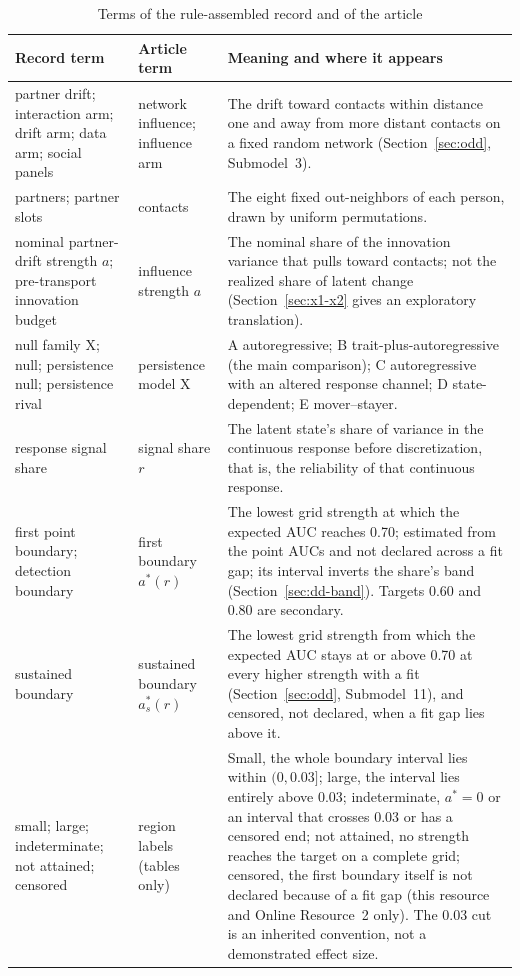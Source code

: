 \begin{table}[htbp]
\caption{Terms of the rule-assembled record and of the article}\label{tab:glossary-terms}
\centering\footnotesize
\begin{tabular}{@{}>{\raggedright\arraybackslash}p{}>{\raggedright\arraybackslash}p{}>{\raggedright\arraybackslash}p{}@{}}
\toprule
Record term & Article term & Meaning and where it appears \\
\midrule
partner drift; interaction arm; drift arm; data arm; social panels & network influence; influence arm & The drift toward contacts within distance one and away from more distant contacts on a fixed random network (Section~\ref{sec:odd}, Submodel~3). \\
partners; partner slots & contacts & The eight fixed out-neighbors of each person, drawn by uniform permutations. \\
nominal partner-drift strength $a$; pre-transport innovation budget & influence strength $a$ & The nominal share of the innovation variance that pulls toward contacts; not the realized share of latent change (Section~\ref{sec:x1-x2} gives an exploratory translation). \\
null family X; null; persistence null; persistence rival & persistence model X & A autoregressive; B trait-plus-autoregressive (the main comparison); C autoregressive with an altered response channel; D state-dependent; E mover--stayer. \\
response signal share & signal share $r$ & The latent state's share of variance in the continuous response before discretization, that is, the reliability of that continuous response. \\
first point boundary; detection boundary & first boundary $a^*(r)$ & The lowest grid strength at which the expected AUC reaches 0.70; estimated from the point AUCs and not declared across a fit gap; its interval inverts the share's band (Section~\ref{sec:dd-band}). Targets 0.60 and 0.80 are secondary. \\
sustained boundary & sustained boundary $a_s^*(r)$ & The lowest grid strength from which the expected AUC stays at or above 0.70 at every higher strength with a fit (Section~\ref{sec:odd}, Submodel~11), and censored, not declared, when a fit gap lies above it. \\
small; large; indeterminate; not attained; censored & region labels (tables only) & Small, the whole boundary interval lies within $(0,0.03]$; large, the interval lies entirely above 0.03; indeterminate, $a^*=0$ or an interval that crosses 0.03 or has a censored end; not attained, no strength reaches the target on a complete grid; censored, the first boundary itself is not declared because of a fit gap (this resource and Online Resource~2 only). The 0.03 cut is an inherited convention, not a demonstrated effect size. \\

\end{tabular}
\end{table}
